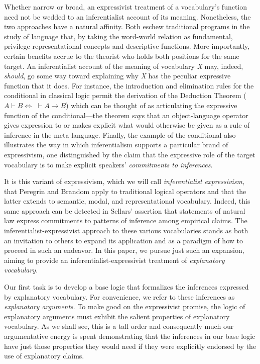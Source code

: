 \documentclass{article}
\theoremstyle{definition}
\theoremstyle{definition}
\theoremstyle{definition}
\theoremstyle{definition}
\theoremstyle{remark}
\theoremstyle{definition}
\theoremstyle{definition}
\begin{document}
Whether narrow or broad, an expressivist treatment of a vocabulary's function need not be wedded to an inferentialist account of its meaning. Nonetheless, the two approaches have a natural affinity. Both eschew traditional programs in the study of language that, by taking the word-world relation as fundamental, privilege representational concepts and descriptive functions. More importantly, certain benefits accrue to the theorist who holds both positions for the same target. An inferentialist account of the meaning of vocabulary \textit{X} may, indeed, \textit{should}, go some way toward explaining why \textit{X} has the peculiar expressive function that it does. For instance, the introduction and elimination rules for the conditional in classical logic permit the derivation of the Deduction Theorem ($A \vdash B \Leftrightarrow\,\, \vdash A \rightarrow B $) which can be thought of as articulating the expressive function of the conditional---the theorem says that an object-language operator gives expression to or makes explicit what would otherwise be given as a rule of inference in the meta-language. Finally, the example of the conditional also illustrates the way in which inferentialism supports a particular brand of expressivism, one distinguished by the claim that the expressive role of the target vocabulary is to make explicit speakers' \textit{commitments to inferences}. 

It is this variant of expressivism, which we will call \textit{inferentialist expressivism}, that Peregrin and Brandom apply to traditional logical operators and that the latter extends to semantic, modal, and representational vocabulary. Indeed, this same approach can be detected in Sellars' assertion that statements of natural law express commitments to patterns of inference among empirical claims. The inferentialist-expressivist approach to these various vocabularies stands as both an invitation to others to expand its application and as a paradigm of how to proceed in such an endeavor. In this paper, we pursue just such an expansion, aiming to provide an inferentialist-expressivist treatment of \textit{explanatory vocabulary}. 

Our first task is to develop a base logic that formalizes the inferences expressed by explanatory vocabulary. For convenience, we refer to these inferences as \textit{explanatory arguments}. To make good on the expressivist promise, the logic of explanatory arguments must exhibit the salient properties of explanatory vocabulary. As we shall see, this is a tall order and consequently much our argumentative energy is spent demonstrating that the inferences in our base logic have just those properties they would need if they were explicitly endorsed by the use of explanatory claims. 
\end{document}
